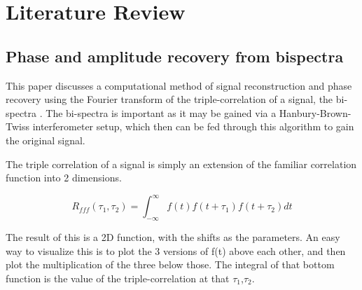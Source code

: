 \documentclass[a4paper]{article}
\begin{document}
\section{Literature Review}
\subsection{Phase and amplitude recovery from bispectra}

This paper discusses a computational method of signal reconstruction and phase recovery using the Fourier transform of the triple-correlation of a signal, the bi-spectra \cite{Bartelt:84}. The bi-spectra is important as it may be gained via a Hanbury-Brown-Twiss interferometer setup, which then can be fed through this algorithm to gain the original signal.

The triple correlation of a signal is simply an extension of the familiar correlation function into 2 dimensions.

\[ 
R_{fff}\left(\tau_1,\tau_2\right)=\int_{-\infty}^{\infty}f\left(t\right)f\left(t+\tau_1\right)f\left(t+\tau_2\right)dt
\]

The result of this is a 2D function, with the shifts as the parameters. An easy way to visualize this is to plot the 3 versions of f(t) above each other, and then plot the multiplication of the three below those. The integral of that bottom function is the value of the triple-correlation at that $\tau_1$,$\tau_2$. 
\end{document}
